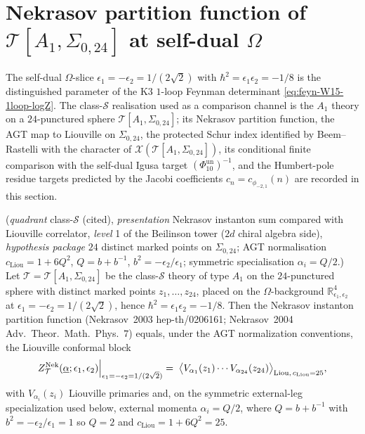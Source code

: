 \section{Nekrasov partition function of $\mathcal{T}[A_1, \Sigma_{0,24}]$ at self-dual $\Omega$}
\label{sec:feyn-nekrasov-A1-sigma-0-24}

The self-dual $\Omega$-slice $\epsilon_1 = -\epsilon_2 = 1/(2\sqrt 2)$
with $\hbar^2 = \epsilon_1\epsilon_2 = -1/8$ is the distinguished
parameter of the K3 $1$-loop Feynman determinant
\eqref{eq:feyn-W15-1loop-logZ}. The class-$\mathcal S$ realisation
used as a comparison channel is the $A_1$ theory on a $24$-punctured
sphere $\mathcal T[A_1, \Sigma_{0,24}]$; its Nekrasov partition
function, the AGT map to Liouville on $\Sigma_{0,24}$, the protected
Schur index identified by Beem--Rastelli with the character of
$\mathcal X(\mathcal T[A_1,\Sigma_{0,24}])$, its conditional finite
comparison with the self-dual Igusa target
$(\Phi_{10}^{\mathrm{un}})^{-1}$, and the Humbert-pole
residue targets predicted by the Jacobi coefficients $c_n =
c_{\phi_{-2,1}}(n)$ are recorded in this section.

\begin{proposition}
\label{prop:feyn-nekrasov-self-dual}
\textup{(}\emph{quadrant} class-$\mathcal{S}$ \textup{(}cited\textup{)},
\emph{presentation} Nekrasov instanton sum compared with Liouville
correlator, \emph{level} 1 of the Beilinson tower
\textup{(}$2d$ chiral algebra side\textup{)}, \emph{hypothesis package}
$24$ distinct marked points on $\Sigma_{0,24}$; AGT normalisation
$c_{\mathrm{Liou}} = 1 + 6Q^2$, $Q = b + b^{-1}$,
$b^2 = -\epsilon_2/\epsilon_1$; symmetric specialisation
$\alpha_i = Q/2$.\textup{)}
Let $\mathcal T = \mathcal T[A_1, \Sigma_{0,24}]$ be the
class-$\mathcal S$ theory of type $A_1$ on the $24$-punctured
sphere with distinct marked points $z_1,\ldots,z_{24}$, placed on the $\Omega$-background
$\mathbb R^4_{\epsilon_1, \epsilon_2}$ at
$\epsilon_1 = -\epsilon_2 = 1/(2\sqrt 2)$, hence
$\hbar^2 = \epsilon_1\epsilon_2 = -1/8$. Then the Nekrasov
instanton partition function (Nekrasov~2003 hep-th/0206161;
Nekrasov~2004 Adv.\ Theor.\ Math.\ Phys.~$7$) equals, under the
AGT normalization conventions, the Liouville conformal block
\[
 Z^{\mathrm{Nek}}_{\mathcal T}(\underline{\alpha};\epsilon_1,\epsilon_2)
 \Bigl|_{\epsilon_1 = -\epsilon_2 = 1/(2\sqrt 2)}
 \;=\;
 \bigl\langle V_{\alpha_1}(z_1)\cdots V_{\alpha_{24}}(z_{24})\bigr\rangle_{
 \mathrm{Liou},\,c_{\mathrm{Liou}} = 25},
\]
with $V_{\alpha_i}(z_i)$ Liouville primaries and, on the symmetric
external-leg specialization used below, external momenta
$\alpha_i = Q/2$, where
$Q = b + b^{-1}$ with $b^2 = -\epsilon_2/\epsilon_1 = 1$ so
$Q = 2$ and $c_{\mathrm{Liou}} = 1 + 6 Q^2 = 25$.
\end{proposition}


